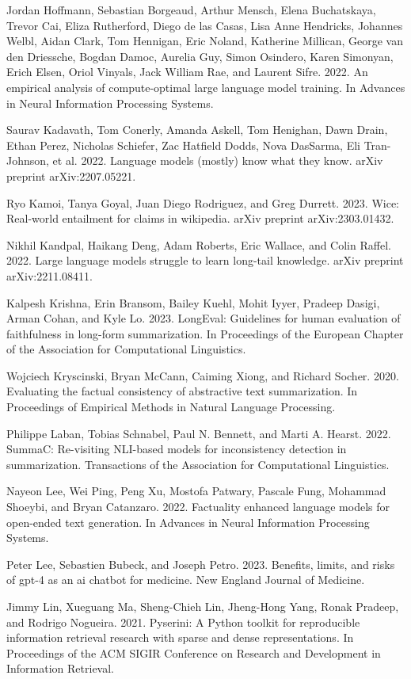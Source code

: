 \documentclass[11pt,UTF8,fontset=fandol]{ctexart}
\begin{document}
Jordan Hoffmann, Sebastian Borgeaud, Arthur Mensch, Elena Buchatskaya, Trevor Cai, Eliza Rutherford, Diego de las Casas, Lisa Anne Hendricks, Johannes Welbl, Aidan Clark, Tom Hennigan, Eric Noland, Katherine Millican, George van den Driessche, Bogdan Damoc, Aurelia Guy, Simon Osindero, Karen Simonyan, Erich Elsen, Oriol Vinyals, Jack William Rae, and Laurent Sifre. 2022. An empirical analysis of compute-optimal large language model training. In Advances in Neural Information Processing Systems.

Saurav Kadavath, Tom Conerly, Amanda Askell, Tom Henighan, Dawn Drain, Ethan Perez, Nicholas Schiefer, Zac Hatfield Dodds, Nova DasSarma, Eli Tran-Johnson, et al. 2022. Language models (mostly) know what they know. arXiv preprint arXiv:2207.05221.

Ryo Kamoi, Tanya Goyal, Juan Diego Rodriguez, and Greg Durrett. 2023. Wice: Real-world entailment for claims in wikipedia. arXiv preprint arXiv:2303.01432.

Nikhil Kandpal, Haikang Deng, Adam Roberts, Eric Wallace, and Colin Raffel. 2022. Large language models struggle to learn long-tail knowledge. arXiv preprint arXiv:2211.08411.

Kalpesh Krishna, Erin Bransom, Bailey Kuehl, Mohit Iyyer, Pradeep Dasigi, Arman Cohan, and Kyle Lo. 2023. LongEval: Guidelines for human evaluation of faithfulness in long-form summarization. In Proceedings of the European Chapter of the Association for Computational Linguistics.

Wojciech Kryscinski, Bryan McCann, Caiming Xiong, and Richard Socher. 2020. Evaluating the factual consistency of abstractive text summarization. In Proceedings of Empirical Methods in Natural Language Processing.

Philippe Laban, Tobias Schnabel, Paul N. Bennett, and Marti A. Hearst. 2022. SummaC: Re-visiting NLI-based models for inconsistency detection in summarization. Transactions of the Association for Computational Linguistics.

Nayeon Lee, Wei Ping, Peng Xu, Mostofa Patwary, Pascale Fung, Mohammad Shoeybi, and Bryan Catanzaro. 2022. Factuality enhanced language models for open-ended text generation. In Advances in Neural Information Processing Systems.

Peter Lee, Sebastien Bubeck, and Joseph Petro. 2023. Benefits, limits, and risks of gpt-4 as an ai chatbot for medicine. New England Journal of Medicine.

Jimmy Lin, Xueguang Ma, Sheng-Chieh Lin, Jheng-Hong Yang, Ronak Pradeep, and Rodrigo Nogueira. 2021. Pyserini: A Python toolkit for reproducible information retrieval research with sparse and dense representations. In Proceedings of the ACM SIGIR Conference on Research and Development in Information Retrieval.
\end{document}
